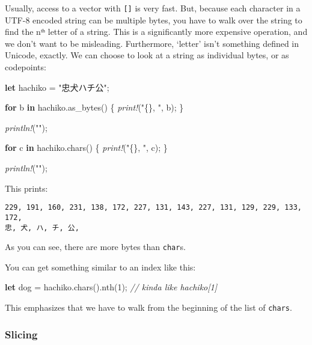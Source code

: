 \documentclass[a4paper,]{book}
\newenvironment{Shaded}{\begin{snugshade}}{\end{snugshade}}
\newcommand{\KeywordTok}[1]{\textcolor[rgb]{0.13,0.29,0.53}{\textbf{{#1}}}}
\newcommand{\DecValTok}[1]{\textcolor[rgb]{0.00,0.00,0.81}{{#1}}}
\newcommand{\StringTok}[1]{\textcolor[rgb]{0.31,0.60,0.02}{{#1}}}
\newcommand{\CommentTok}[1]{\textcolor[rgb]{0.56,0.35,0.01}{\textit{{#1}}}}
\newcommand{\PreprocessorTok}[1]{\textcolor[rgb]{0.56,0.35,0.01}{\textit{{#1}}}}
\newcommand{\NormalTok}[1]{{#1}}
\begin{document}
Usually, access to a vector with \texttt{{[}{]}} is very fast. But,
because each character in a UTF-8 encoded string can be multiple bytes,
you have to walk over the string to find the nᵗʰ letter of a string.
This is a significantly more expensive operation, and we don't want to
be misleading. Furthermore, `letter' isn't something defined in Unicode,
exactly. We can choose to look at a string as individual bytes, or as
codepoints:

\begin{Shaded}
\begin{Highlighting}[]
\KeywordTok{let} \NormalTok{hachiko = }\StringTok{"忠犬ハチ公"}\NormalTok{;}

\KeywordTok{for} \NormalTok{b }\KeywordTok{in} \NormalTok{hachiko.as_bytes() \{}
    \PreprocessorTok{print!}\NormalTok{(}\StringTok{"\{\}, "}\NormalTok{, b);}
\NormalTok{\}}

\PreprocessorTok{println!}\NormalTok{(}\StringTok{""}\NormalTok{);}

\KeywordTok{for} \NormalTok{c }\KeywordTok{in} \NormalTok{hachiko.chars() \{}
    \PreprocessorTok{print!}\NormalTok{(}\StringTok{"\{\}, "}\NormalTok{, c);}
\NormalTok{\}}

\PreprocessorTok{println!}\NormalTok{(}\StringTok{""}\NormalTok{);}
\end{Highlighting}
\end{Shaded}

This prints:

\begin{verbatim}
229, 191, 160, 231, 138, 172, 227, 131, 143, 227, 131, 129, 229, 133, 172,
忠, 犬, ハ, チ, 公,
\end{verbatim}

As you can see, there are more bytes than \texttt{char}s.

You can get something similar to an index like this:

\begin{Shaded}
\begin{Highlighting}[]
\KeywordTok{let} \NormalTok{dog = hachiko.chars().nth(}\DecValTok{1}\NormalTok{); }\CommentTok{// kinda like hachiko[1]}
\end{Highlighting}
\end{Shaded}

This emphasizes that we have to walk from the beginning of the list of
\texttt{chars}.

\subsubsection{Slicing}\label{slicing}
\end{document}
